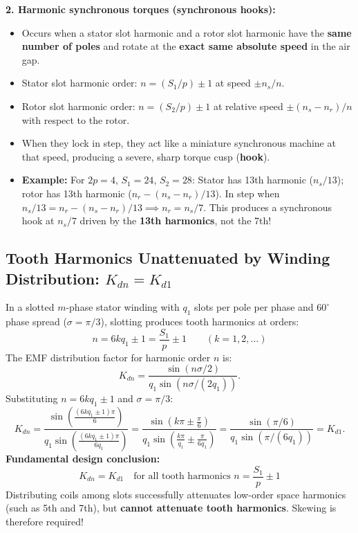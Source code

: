 \textbf{2. Harmonic synchronous torques (synchronous hooks):}
\begin{itemize}
  \item Occurs when a stator slot harmonic and a rotor slot harmonic have the \textbf{same number of poles} and rotate at the \textbf{exact same absolute speed} in the air gap.
  \item Stator slot harmonic order: $n = (S_1/p)\pm 1$ at speed $\pm n_s/n$.
  \item Rotor slot harmonic order: $n = (S_2/p)\pm 1$ at relative speed $\pm (n_s - n_r)/n$ with respect to the rotor.
  \item When they lock in step, they act like a miniature synchronous machine at that speed, producing a severe, sharp torque cusp (\textbf{hook}).
  \item \textbf{Example:} For $2p = 4$, $S_1 = 24$, $S_2 = 28$:
  Stator has 13th harmonic ($n_s/13$); rotor has 13th harmonic ($n_r - (n_s - n_r)/13$).
  In step when $n_s/13 = n_r - (n_s - n_r)/13 \implies n_r = n_s/7$.
  This produces a synchronous hook at $n_s/7$ driven by the \textbf{13th harmonics}, not the 7th!
\end{itemize}

\subsection{Tooth Harmonics Unattenuated by Winding Distribution: \texorpdfstring{$K_{dn} = K_{d1}$}{Kdn = Kd1}}
In a slotted $m$-phase stator winding with $q_1$ slots per pole per phase and $60^\circ$ phase spread ($\sigma = \pi/3$), slotting produces tooth harmonics at orders:
\begin{equation}
\boxed{n = 6k q_1 \pm 1 = \frac{S_1}{p} \pm 1 \qquad (k = 1, 2, \dots)}
\end{equation}
The EMF distribution factor for harmonic order $n$ is:
\begin{equation}
K_{dn} = \frac{\sin(n\sigma / 2)}{q_1 \sin(n\sigma / (2q_1))}.
\end{equation}
Substituting $n = 6k q_1 \pm 1$ and $\sigma = \pi/3$:
\begin{equation}
K_{dn} = \frac{\sin\left(\frac{(6k q_1 \pm 1)\pi}{6}\right)}{q_1 \sin\left(\frac{(6k q_1 \pm 1)\pi}{6q_1}\right)}
= \frac{\sin\left(k\pi \pm \frac{\pi}{6}\right)}{q_1 \sin\left(\frac{k\pi}{q_1} \pm \frac{\pi}{6q_1}\right)}
= \frac{\sin(\pi/6)}{q_1 \sin(\pi/(6q_1))} = K_{d1}.
\end{equation}
\textbf{Fundamental design conclusion:}
\begin{equation}
\boxed{K_{dn} = K_{d1} \quad \text{for all tooth harmonics } n = \frac{S_1}{p}\pm 1}
\end{equation}
Distributing coils among slots successfully attenuates low-order space harmonics (such as 5th and 7th), but \textbf{cannot attenuate tooth harmonics}. Skewing is therefore required!

